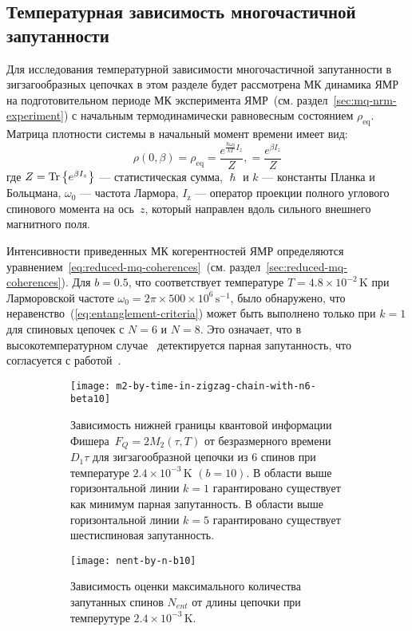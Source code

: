 \subsection{Температурная зависимость многочастичной запутанности}
Для исследования температурной зависимости многочастичной запутанности
в зигзагообразных цепочках
в этом разделе будет рассмотрена МК динамика ЯМР
на подготовительном периоде МК эксперимента ЯМР~(см. раздел~\ref{sec:mq-nrm-experiment})
с начальным термодинамически равновесным состоянием $\rho_\mathrm{eq}$.
Матрица плотности системы в начальный момент времени имеет вид:
\begin{equation}
  \rho(0, \beta)
  = \rho_\mathrm{eq}
  = \dfrac{e^{\frac{\hbar\omega_{0}}{kT} I_z}}{Z},
  = \dfrac{e^{\beta I_z}}{Z}
\end{equation}
где $Z = \mathrm{Tr} \left\{ e^{\beta I_z} \right\}$ --- статистическая сумма,
$\hslash$ и $k$ --- константы Планка и Больцмана,
$\omega_{0}$ --- частота Лармора,
$I_\mathrm{z}$ ---  оператор проекции полного углового спинового момента  на ось~$z$,
который направлен вдоль сильного внешнего магнитного поля.

Интенсивности приведенных МК когерентностей ЯМР определяются уравнением~\ref{eq:reduced-mq-coherences}~(см. раздел~\ref{sec:reduced-mq-coherences}).
Для $b=0.5$,
что соответствует температуре $T=4.8 \times 10^{-2}\,\mbox{K}$
при Ларморовской частоте $\omega_0=2\pi\times 500\times 10^6 \,\mbox{s}^{-1}$,
было обнаружено,
что неравенство~(\ref{eq:entanglement-criteria}) может быть выполнено только при $k=1$ для спиновых цепочек с $N=6$ и $N=8$.
Это означает, что в высокотемпературном случае~\cite{Doronin2019}
детектируется парная запутанность,
что согласуется с работой~\cite{Feldman2012}.

\begin{figure}[H]
  \begin{subfigure}[t]{0.49\textwidth}
    \texttt{[image: m2-by-time-in-zigzag-chain-with-n6-beta10]}				
    \caption{
      Зависимость нижней границы квантовой информации
      Фишера~$F_Q=2M_2(\tau, T)$
      от безразмерного времени~$D_1\tau$
      для зигзагообразной цепочки из 6 спинов
      при температуре $2.4\times 10^{-3}\,\mbox{K}$ $(b=10)$.
      В области выше горизонтальной линии $k=1$
      гарантировано существует как минимум парная запутанность.
      В области выше горизонтальной линии $k=5$
      гарантировано существует шестиспиновая запутанность.
    }
    \label{fig:fig3}
  \end{subfigure}
  \hfill
  \begin{subfigure}[t]{0.49\textwidth}
    \texttt{[image: nent-by-n-b10]}	
    \caption{
      Зависимость оценки максимального количества запутанных спинов $N_{ent}$ от длины цепочки при темперутуре $2.4\times 10^{-3}\,\mbox{K}$.
    }
    \label{fig:fig4}
  \end{subfigure}
  \caption{}
\end{figure}

